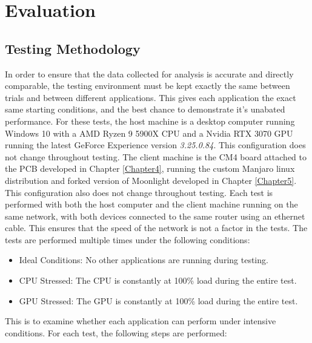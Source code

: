\chapter{Evaluation} %

\label{Chapter6} %


\section{Testing Methodology}

In order to ensure that the data collected for analysis is accurate and directly comparable, the testing environment must be kept exactly the same between trials and between different applications.
This gives each application the exact same starting conditions, and the best chance to demonstrate it's unabated performance.
For these tests, the host machine is a desktop computer running Windows 10 with a AMD Ryzen 9 5900X CPU and a Nvidia RTX 3070 GPU running the latest GeForce Experience version \emph{3.25.0.84}.
This configuration does not change throughout testing.
The client machine is the CM4 board attached to the PCB developed in Chapter \ref{Chapter4}, running the custom Manjaro linux distribution and forked version of Moonlight developed in Chapter \ref{Chapter5}.
This configuration also does not change throughout testing.
Each test is performed with both the host computer and the client machine running on the same network, with both devices connected to the same router using an ethernet cable.
This ensures that the speed of the network is not a factor in the tests.
The tests are performed multiple times under the following conditions:

\begin{itemize}
  \item Ideal Conditions: No other applications are running during testing.
  \item CPU Stressed: The CPU is constantly at 100\% load during the entire test.
  \item GPU Stressed: The GPU is constantly at 100\% load during the entire test.
\end{itemize}

\noindent
This is to examine whether each application can perform under intensive conditions.
For each test, the following steps are performed:

